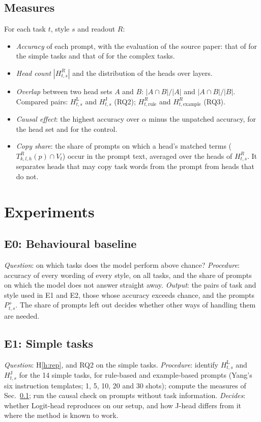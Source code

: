 \documentclass[11pt,a4paper]{article}
\begin{document}
\subsection{Measures}\label{sec:measures}
For each task $t$, style $s$ and readout $R$:
\begin{itemize}
\item \emph{Accuracy} of each prompt, with the evaluation of the source paper: that of \citet{yang2026shared} for the simple tasks and that of \citet{fu2026rules} for the complex tasks.
\item \emph{Head count} $|H^{R}_{t,s}|$ and the distribution of the heads over layers.
\item \emph{Overlap} between two head sets $A$ and $B$: $|A\cap B|/|A|$ and $|A\cap B|/|B|$. Compared pairs: $H^{\mathrm{L}}_{t,s}$ and $H^{\mathrm{J}}_{t,s}$ (RQ2); $H^{R}_{t,\text{rule}}$ and $H^{R}_{t,\text{example}}$ (RQ3).
\item \emph{Causal effect}: the highest accuracy over $\alpha$ minus the unpatched accuracy, for the head set and for the control.
\item \emph{Copy share}: the share of prompts on which a head's matched terms ($T^{R}_{k,l,h}(p)\cap V_t$) occur in the prompt text, averaged over the heads of $H^{R}_{t,s}$. It separates heads that may copy task words from the prompt from heads that do not.
\end{itemize}

\section{Experiments}\label{sec:experiments}
\subsection{E0: Behavioural baseline}\label{sec:e0}
\emph{Question}: on which tasks does the model perform above chance? \emph{Procedure}: accuracy of every wording of every style, on all tasks, and the share of prompts on which the model does not answer straight away. \emph{Output}: the pairs of task and style used in E1 and E2, those whose accuracy exceeds chance, and the prompts $P^{+}_{t,s}$. The share of prompts left out decides whether other ways of handling them are needed.

\subsection{E1: Simple tasks}\label{sec:e1}
\emph{Question}: H\ref{h:rep}, and RQ2 on the simple tasks. \emph{Procedure}: identify $H^{\mathrm{L}}_{t,s}$ and $H^{\mathrm{J}}_{t,s}$ for the 14 simple tasks, for rule-based and example-based prompts (Yang's six instruction templates; 1, 5, 10, 20 and 30 shots); compute the measures of Sec.~\ref{sec:measures}; run the causal check on prompts without task information. \emph{Decides}: whether Logit-head reproduces \citet{yang2026shared} on our setup, and how J-head differs from it where the method is known to work.
\end{document}
